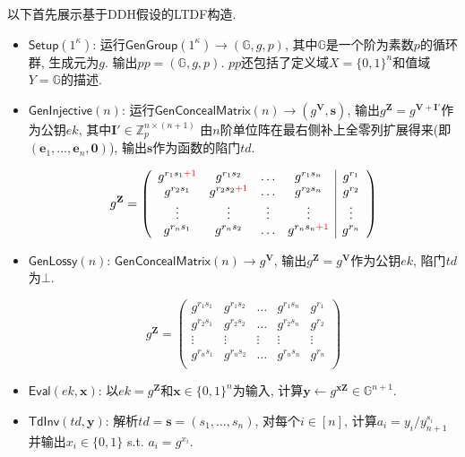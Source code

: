 以下首先展示基于DDH假设的LTDF构造. 
\begin{construction}
\begin{itemize}
\item $\mathsf{Setup}(1^\kappa)$: 运行$\mathsf{GenGroup}(1^\kappa) \rightarrow (\mathbb{G}, g, p)$, 
	其中$\mathbb{G}$是一个阶为素数$p$的循环群, 生成元为$g$. 输出$pp = (\mathbb{G}, g, p)$. 
	$pp$还包括了定义域$X = \{0,1\}^n$和值域$Y = \mathbb{G}$的描述. 

\item $\mathsf{GenInjective}(n)$: 运行$\mathsf{GenConcealMatrix}(n) \rightarrow (g^{\mathbf{V}}, \mathbf{s})$, 
	输出$g^{\mathbf{Z}} = g^{\mathbf{V}+\mathbf{I}'}$作为公钥$ek$, 
	其中$\mathbf{I}' \in \mathbb{Z}_p^{n \times (n+1)}$
	由$n$阶单位阵在最右侧补上全零列扩展得来(即$(\mathbf{e}_1, \dots, \mathbf{e}_n, \mathbf{0})$), 
	输出$\mathbf{s}$作为函数的陷门$td$. 

\begin{displaymath} 
g^\mathbf{Z} = \left( \begin{array}{cccc|c}
g^{r_1s_1{\color{red} +1}} & g^{r_1s_2} & \ldots & g^{r_1s_n} & g^{r_1} \\
g^{r_2s_1} & g^{r_2s_2{\color{red} +1}} & \ldots & g^{r_2s_n} & g^{r_2}\\
\vdots & \vdots & \vdots & \vdots & \vdots\\
g^{r_ns_1} & g^{r_ns_2} & \ldots & g^{r_ns_n{\color{red} +1}} & g^{r_n}\\
\end{array} \right)
\end{displaymath}

\item $\mathsf{GenLossy}(n)$: $\mathsf{GenConcealMatrix}(n) \rightarrow g^{\mathbf{V}}$, 
    输出$g^\mathbf{Z} = g^{\mathbf{V}}$作为公钥$ek$, 陷门$td$为$\bot$. 

\begin{displaymath} 
g^\mathbf{Z} = \left( \begin{array}{cccc|c}
g^{r_1s_1} & g^{r_1s_2} & \ldots & g^{r_1s_n} & g^{r_1} \\
g^{r_2s_1} & g^{r_2s_2} & \ldots & g^{r_2s_n} & g^{r_2}\\
\vdots & \vdots & \vdots & \vdots & \vdots\\
g^{r_ns_1} & g^{r_ns_2} & \ldots & g^{r_ns_n} & g^{r_n}\\
\end{array} \right)
\end{displaymath}

\item $\mathsf{Eval}(ek, \mathbf{x})$: 以$ek = g^\mathbf{Z}$和$\mathbf{x} \in \{0,1\}^n$为输入, 
    计算$\mathbf{y} \leftarrow g^{\mathbf{x}\mathbf{Z}} \in \mathbb{G}^{n+1}$. 

\item $\mathsf{TdInv}(td, \mathbf{y})$: 解析$td = \mathbf{s} = (s_1, \dots, s_n)$, 对每个$i \in [n]$, 
    计算$a_i = y_i/y_{n+1}^{s_i}$并输出$x_i \in \{0,1\}$ s.t. $a_i = g^{x_i}$. 
\end{itemize}
\end{construction}

